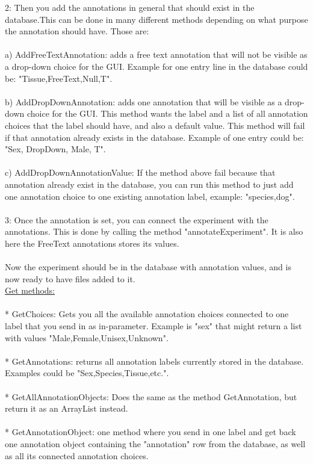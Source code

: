2: Then you add the annotations in general that should exist in the database.This can be done in many different methods depending on what purpose the annotation should have. Those are:\\
\\
a) AddFreeTextAnnotation: adds a free text annotation that will not be visible as a drop-down choice for the GUI. Example for one entry line in the database could be: "Tissue,FreeText,Null,T".\\
\\
b) AddDropDownAnnotation: adds one annotation that will be visible as a drop-down choice for the GUI. This method wants the label and a list of all annotation choices that the label should have, and also a default value. This method will fail if that annotation already exists in the database. Example of one entry could be: "Sex, DropDown, Male, T".\\
\\
c) AddDropDownAnnotationValue: If the method above fail because that annotation already exist in the database, you can run this method to just add one annotation choice to one existing annotation label, example: "species,dog".\\
\\
3: Once the annotation is set, you can connect the experiment with the annotations. This is done by calling the method "annotateExperiment". It is also here the FreeText annotations stores its values.\\
\\
Now the experiment should be in the database with annotation values, and is now ready to have files added to it.\\
\newpage
\underline{Get methods:}\\
\\
* GetChoices: Gets you all the available annotation choices connected to one label that you send in as in-parameter. Example is "sex" that might return a list with values "Male,Female,Unisex,Unknown".\\
\\
* GetAnnotations: returns all annotation labels currently stored in the database. Examples could be "Sex,Species,Tissue,etc.".\\
\\
* GetAllAnnotationObjects: Does the same as the method GetAnnotation, but return it as an ArrayList instead.\\
\\
* GetAnnotationObject: one method where you send in one label and get back one annotation object containing the "annotation" row  from the database, as well as all its connected annotation choices.\\
